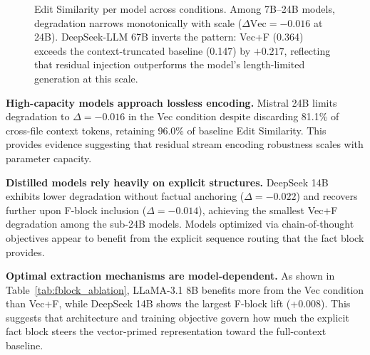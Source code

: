\documentclass[11pt]{article}
\begin{document}
\begin{figure}[h]
\centering
{}
\caption{Edit Similarity per model across conditions. Among 7B--24B models, degradation narrows monotonically with scale ($\Delta\text{Vec} = -0.016$ at 24B). DeepSeek-LLM 67B inverts the pattern: Vec+F (0.364) exceeds the context-truncated baseline (0.147) by $+0.217$, reflecting that residual injection outperforms the model's length-limited generation at this scale.}
\label{fig:repobench_bars}
\end{figure}

\textbf{High-capacity models approach lossless encoding.} Mistral 24B limits degradation to $\Delta = -0.016$ in the Vec condition despite discarding 81.1\% of cross-file context tokens, retaining 96.0\% of baseline Edit Similarity. This provides evidence suggesting that residual stream encoding robustness scales with parameter capacity.

\textbf{Distilled models rely heavily on explicit structures.} DeepSeek 14B exhibits lower degradation without factual anchoring ($\Delta = -0.022$) and recovers further upon F-block inclusion ($\Delta = -0.014$), achieving the smallest Vec+F degradation among the sub-24B models. Models optimized via chain-of-thought objectives appear to benefit from the explicit sequence routing that the fact block provides.

\textbf{Optimal extraction mechanisms are model-dependent.} As shown in Table~\ref{tab:fblock_ablation}, LLaMA-3.1 8B benefits more from the Vec condition than Vec+F, while DeepSeek 14B shows the largest F-block lift (+0.008). This suggests that architecture and training objective govern how much the explicit fact block steers the vector-primed representation toward the full-context baseline.
\end{document}
